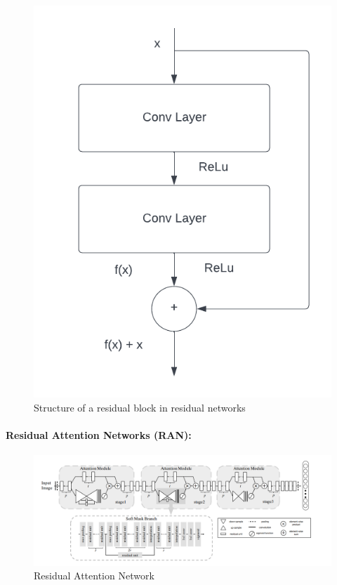 \begin{figure}[!htbp]
    \centering
    \includegraphics[scale=0.65]{figures/residual_block.png}
    \caption{Structure of a residual block in residual networks \cite{ung2021efficient}}
    \label{fig:residual_block}
\end{figure}

\paragraph{Residual Attention Networks (RAN):}

\begin{figure}
    \centering
    \includegraphics[scale=0.5]{figures/RAN.png}
    \caption{Residual Attention Network \cite{wang2017residual}}
    \label{fig:my_label}
\end{figure}

